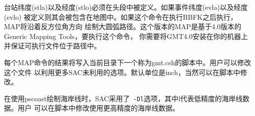 台站纬度(stla)以及经度(stlo)必须在头段中被定义。如果事件纬度(evla)以及经度(evlo)
被定义则其会被包含在地图中。如果这个命令在执行BBFK之后执行，MAP将沿着反方位角方向
绘制大圆弧路径。这个版本的MAP是基于4.0版本的Generic Mapping Tools，要执行这个命令，
你需要将GMT4.0安装在你的机器上并保证可执行文件位于路径中。

每个MAP命令的结果将写入当前目录下一个称为gmt.csh的脚本中。用户可以修改这个文件
以利用更多SAC未利用的选项。默认单位是inch，当然可以在脚本中修改。

在使用pscoast绘制海岸线时，SAC采用了~\verb+-Dl+选项，其中l代表低精度的海岸线数据。用户
可以在脚本中修改使用更高精度的海岸线数据。
